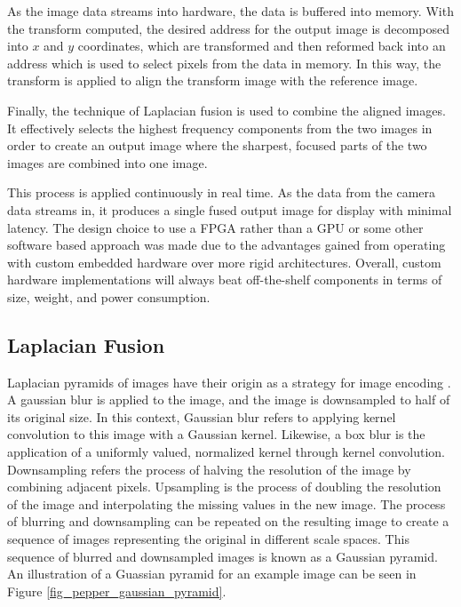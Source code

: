 \documentclass{article}
\begin{document}
As the image data streams into hardware, the data is buffered into memory. With the transform computed, the desired address for the output image is decomposed into $x$ and $y$ coordinates, which are transformed and then reformed back into an address which is used to select pixels from the data in memory. In this way, the transform is applied to align the transform image with the reference image.

Finally, the technique of Laplacian fusion is used to combine the aligned images. It effectively selects the highest frequency components from the two images in order to create an output image where the sharpest, focused parts of the two images are combined into one image.

This process is applied continuously in real time. As the data from the camera data streams in, it produces a single fused output image for display with minimal latency. The design choice to use a FPGA rather than a GPU or some other software based approach was made due to the advantages gained from operating with custom embedded hardware over more rigid architectures. Overall, custom hardware implementations will always beat off-the-shelf components in terms of size, weight, and power consumption.

\subsection{Laplacian Fusion}

Laplacian pyramids of images have their origin as a strategy for image encoding \cite{burt_laplacian_1983}. A gaussian blur is applied to the image, and the image is downsampled to half of its original size. In this context, Gaussian blur refers to applying kernel convolution to this image with a Gaussian kernel. Likewise, a box blur is the application of a uniformly valued, normalized kernel through kernel convolution. Downsampling refers the process of halving the resolution of the image by combining adjacent pixels. Upsampling is the process of doubling the resolution of the image and interpolating the missing values in the new image. The process of blurring and downsampling can be repeated on the resulting image to create a sequence of images representing the original in different scale spaces. This sequence of blurred and downsampled images is known as a Gaussian pyramid. An illustration of a Guassian pyramid for an example image can be seen in Figure \ref{fig_pepper_gaussian_pyramid}.
\end{document}
